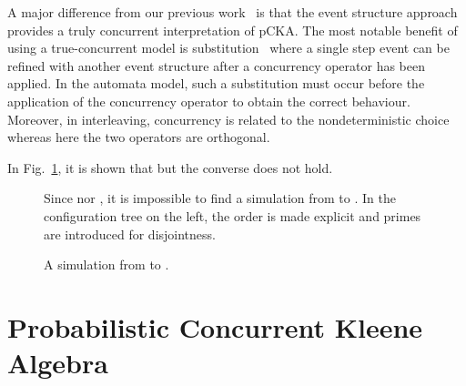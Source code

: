 \documentclass{llncs}
\newcommand{\<}{\langle}
\renewcommand{\>}{\rangle}
\begin{document}
A major difference from our previous work~\cite{Rab13} is that the event structure approach provides a truly concurrent interpretation of pCKA. The most notable benefit of using a true-concurrent model is substitution~\cite{Gor97,Gis88} where a single step event can be refined with another event structure after a concurrency operator has been applied. In the automata model, such a substitution must occur before the application of the concurrency operator to obtain the correct behaviour. Moreover, in interleaving, concurrency is related to the nondeterministic choice whereas here the two operators are orthogonal. 
\begin{example}
In Fig.~\ref{fig:concurrency}, it is shown that  but the converse does not hold. 
\end{example}
\begin{figure}[!ht]
\begin{tiny}

\end{tiny}
Since  nor , it is impossible to find a simulation from  to . In the configuration tree on the left, the order  is made explicit and primes are introduced for disjointness.
\caption{A simulation from  to . }\label{fig:concurrency}
\end{figure}

\section{Probabilistic Concurrent Kleene Algebra}\label{pcka}
\end{document}
